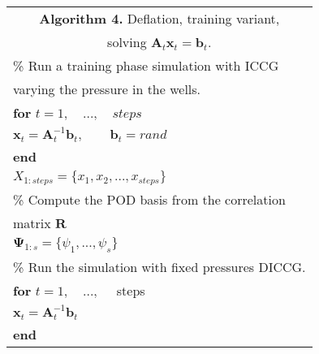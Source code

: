 \documentclass[times,final]{elsarticle}
\begin{document}
\begin{minipage}{0.45\textwidth}
\vspace{-0.7cm}
\begin{tabular}{ |l | } 
\hline
 \multicolumn{1}{|c|}{\textbf{Algorithm 4.} Deflation, training variant,}\\
 \multicolumn{1}{|c|}{ solving $\mathbf{A}_t\mathbf{x}_t=\mathbf{b}_t$.}\\
 \hline
 \footnotesize \%  Run a training phase simulation with {ICCG} \\\footnotesize varying the pressure in the wells.\\
\hspace{0.5cm}\textbf{for} $t=1,\quad ...,\quad steps$ \\
\hspace{1cm}$\mathbf{x}_t=\mathbf{A}_t^{-1}\mathbf{b}_t,\qquad \mathbf{b}_t= rand$\\
\hspace{0.5cm}\textbf{end}\\
 \hspace{0.5cm}$X_{1:steps}=\{x_1,x_2,...,x_{steps}\}$  \\ 
 \footnotesize \% Compute the POD basis from the correlation \\
 \footnotesize matrix $\mathbf{R}$\\
 \hspace{1cm}$\mathbf{\Psi}_{1:s}= \{\psi_{1}, ... ,\psi_{s}\}$\\ 
 \footnotesize \% Run the simulation with fixed pressures {DICCG}.\\
 \hspace{0.5cm}\textbf{for} $t=1,\quad ...,\quad$ steps\\
 \hspace{1cm}$\mathbf{x}_t=\mathbf{A}_t^{-1}\mathbf{b}_t$\\
 \hspace{0.5cm}\textbf{end}\\
\hline
\end{tabular}
\end{minipage}\par
\end{document}
